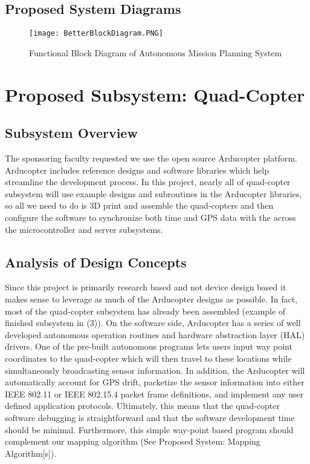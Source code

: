 \documentclass[11pt,letterpaper,titlepage]{article}
\begin{document}
\begin{onehalfspace}
\subsection{Proposed System Diagrams}
\begin{wrapfigure}{rth}{0.55\textwidth}

\centering
\texttt{[image: BetterBlockDiagram.PNG]}
\caption{Functional Block Diagram of Autonomous Mission Planning System}
\end{wrapfigure}

\section{Proposed Subsystem: Quad-Copter}
\subsection{Subsystem Overview}
The sponsoring faculty requested we use the open source Arducopter platform. Arducopter includes reference designs and software libraries which help streamline the development process. In this project, nearly all of quad-copter subsystem will use example designs and subroutines in the Arducopter libraries, so all we need to do is 3D print and assemble the quad-copters and then configure the software to synchronize both time and GPS data with the across the microcontroller and server subsystems. 

\subsection{Analysis of Design Concepts}
Since this project is primarily research based and not device design based it makes sense to leverage as much of the Arducopter designs as possible. In fact, most of the quad-copter subsystem has already been assembled (example of finished subsystem in (3)). On the software side, Arducopter has a series of well developed autonomous operation routines and hardware abstraction layer (HAL) drivers. One of the pre-built autonomous programs lets users input way point coordinates to the quad-copter which will then travel to these locations while simultaneously broadcasting sensor information. In addition, the Arducopter will automatically account for GPS drift, packetize the sensor information into either IEEE 802.11 or IEEE 802.15.4 packet frame definitions, and implement any user defined application protocols. Ultimately, this means that the quad-copter software debugging is straightforward and that the software development time should be minimal. Furthermore, this simple way-point based program should complement our mapping algorithm (See Proposed System: Mapping Algorithm[s]).


\end{onehalfspace}
\end{document}
